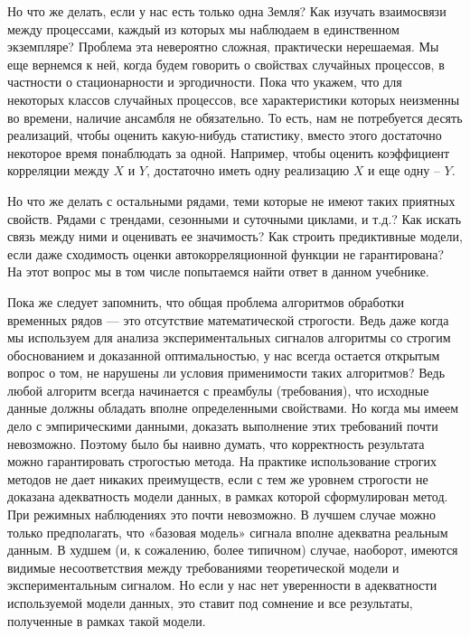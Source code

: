 
Но что же делать, если у нас есть только одна Земля? Как изучать
взаимосвязи между процессами, каждый из которых мы наблюдаем в
единственном экземпляре? Проблема эта невероятно сложная,
практически нерешаемая. Мы еще вернемся к ней, когда будем говорить
о свойствах случайных процессов, в частности о стационарности и эргодичности.
Пока что укажем, что для некоторых классов случайных
процессов, все характеристики которых неизменны во времени, наличие
ансамбля не обязательно. То есть, нам не потребуется десять
реализаций, чтобы оценить какую-нибудь статистику, вместо этого
достаточно некоторое время понаблюдать за одной. Например, чтобы
оценить коэффициент корреляции между $X$ и $Y$, достаточно иметь одну
реализацию $X$ и еще одну – $Y$.

Но что же делать с остальными рядами, теми которые не имеют таких
приятных свойств. Рядами с трендами, сезонными и суточными
циклами, и т.д.? Как искать связь между ними и оценивать ее
значимость? Как строить предиктивные модели, если даже сходимость
оценки автокорреляционной функции не гарантирована? На этот вопрос мы в том
числе попытаемся найти ответ в данном учебнике.

Пока же следует запомнить, что общая проблема алгоритмов обработки
временных рядов — это отсутствие математической строгости. Ведь даже когда
мы используем для анализа экспериментальных сигналов алгоритмы со
строгим обоснованием и доказанной оптимальностью, у нас всегда
остается открытым вопрос о том, не нарушены ли условия применимости
таких алгоритмов? Ведь любой алгоритм всегда начинается с преамбулы
(требования), что исходные данные должны обладать вполне
определенными свойствами. Но когда мы имеем дело с
эмпирическими данными, доказать выполнение этих требований
почти невозможно. Поэтому было бы наивно думать, что корректность
результата можно гарантировать строгостью метода. На практике
использование строгих методов не дает никаких преимуществ, если с
тем же уровнем строгости не доказана адекватность модели данных, в
рамках которой сформулирован метод. При режимных наблюдениях это
почти невозможно. В лучшем случае можно только предполагать, что
«базовая модель» сигнала вполне адекватна реальным данным. В худшем
(и, к сожалению, более типичном) случае, наоборот, имеются видимые
несоответствия между требованиями теоретической модели и
экспериментальным сигналом. Но если у нас нет уверенности в
адекватности используемой модели данных, это ставит под сомнение и
все результаты, полученные в рамках такой модели.

